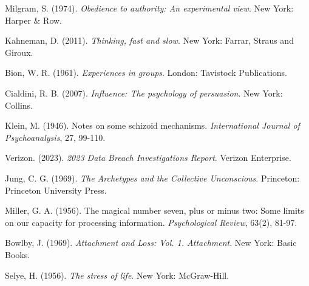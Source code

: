 \documentclass[11pt,a4paper]{article}
\begin{document}
\begin{thebibliography}{99}

Milgram, S. (1974). \textit{Obedience to authority: An experimental view}. New York: Harper \& Row.

Kahneman, D. (2011). \textit{Thinking, fast and slow}. New York: Farrar, Straus and Giroux.

Bion, W. R. (1961). \textit{Experiences in groups}. London: Tavistock Publications.

Cialdini, R. B. (2007). \textit{Influence: The psychology of persuasion}. New York: Collins.

Klein, M. (1946). Notes on some schizoid mechanisms. \textit{International Journal of Psychoanalysis}, 27, 99-110.

Verizon. (2023). \textit{2023 Data Breach Investigations Report}. Verizon Enterprise.

Jung, C. G. (1969). \textit{The Archetypes and the Collective Unconscious}. Princeton: Princeton University Press.

Miller, G. A. (1956). The magical number seven, plus or minus two: Some limits on our capacity for processing information. \textit{Psychological Review}, 63(2), 81-97.

Bowlby, J. (1969). \textit{Attachment and Loss: Vol. 1. Attachment}. New York: Basic Books.

Selye, H. (1956). \textit{The stress of life}. New York: McGraw-Hill.

\end{thebibliography}
\end{document}
